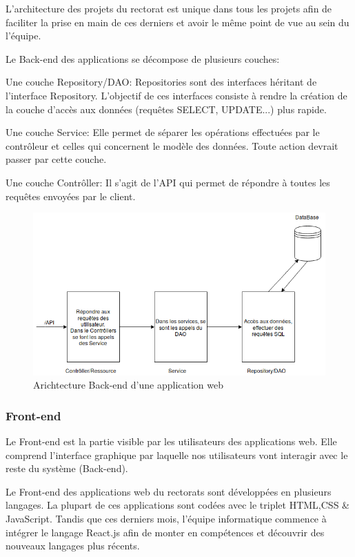 \documentclass[12pt]{article}
\begin{document}
L'architecture des projets du rectorat est unique dans tous les projets afin  de faciliter la prise en main de ces derniers et avoir le même point de vue au sein du l'équipe.

Le Back-end des applications se décompose de plusieurs couches: \newline

Une couche Repository/DAO: Repositories sont des interfaces héritant de l'interface Repository. L'objectif de ces interfaces consiste à rendre la création de la couche d'accès aux données (requêtes SELECT, UPDATE...) plus rapide.\newline


Une couche Service: Elle permet de séparer les opérations effectuées par le contrôleur et celles qui concernent le modèle des données. Toute action devrait passer par cette couche.\newline


Une couche Contrôller: Il s'agit de l'API qui permet de répondre à toutes les requêtes envoyées par le client. 

\begin{figure}[H]
	\centering
 		\includegraphics[width=1\textwidth]{diagrammes/ArchitectureProjet.png}
  		\caption{Arichtecture Back-end d'une application web}
	\end{figure}

\subsubsection{Front-end}
Le Front-end est la partie visible par les utilisateurs des applications web. Elle comprend l'interface graphique par laquelle nos utilisateurs vont interagir avec le reste du système (Back-end).


Le Front-end des applications web du rectorats sont développées en plusieurs langages. La plupart de ces applications  sont codées avec le triplet HTML,CSS \& JavaScript. Tandis que ces derniers mois, l'équipe informatique commence à intégrer le langage React.js  afin de monter en compétences et découvrir des nouveaux langages plus récents. 
\end{document}
